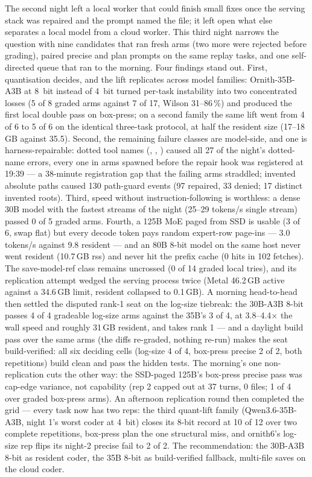\begin{center}
\begin{minipage}{0.86\textwidth}
The second night left a local worker that could finish small fixes once the serving stack was repaired and the
prompt named the file; it left open what else separates a local model from a cloud worker. This third night
narrows the question with nine candidates that ran fresh arms (two more were rejected before grading), paired
precise and plan prompts on the same replay tasks, and one self-directed queue that ran to the morning. Four
findings stand out. First, quantisation decides, and the lift replicates across model families: Ornith-35B-A3B at
8~bit instead of 4~bit turned per-task instability into two concentrated losses (5 of 8 graded arms against 7 of
17, Wilson 31--86\,\%) and produced the first local double pass on box-press; on a second family the same lift
went from 4 of 6 to 5 of 6 on the identical three-task protocol, at half the resident size (17--18\,GB against
35.5). Second, the remaining failure classes are model-side, and one is harness-repairable: dotted tool names
(, , ) caused all 27 of the night's dotted-name errors, every one in
arms spawned before the repair hook was registered at 19:39 --- a 38-minute registration gap that the failing
arms straddled; invented absolute paths caused 130 path-guard events (97 repaired, 33 denied; 17 distinct
invented roots). Third, speed without instruction-following is worthless: a dense 30B model with the fastest
streams of the night (25--29 tokens/s single stream) passed 0 of 5 graded arms. Fourth, a 125B MoE paged from
SSD is usable (3 of 6, swap flat) but every decode token pays random expert-row page-ins --- 3.0 tokens/s
against 9.8 resident --- and an 80B 8-bit model on the same host never went resident (10.7\,GB rss) and never hit
the prefix cache (0 hits in 102 fetches). The save-model-ref class remains uncrossed (0 of 14 graded local
tries), and its replication attempt wedged the serving process twice (Metal 46.2\,GB active against a 34.6\,GB
limit, resident collapsed to 0.1\,GB). A morning head-to-head then settled the disputed rank-1 seat on the
log-size tiebreak: the 30B-A3B 8-bit passes 4 of 4 gradeable log-size arms against the 35B's 3 of 4, at
3.8--4.4$\times$ the wall speed and roughly 31\,GB resident, and takes rank 1 --- and a daylight build pass over
the same arms (the diffs re-graded, nothing re-run) makes the seat build-verified: all six deciding cells
(log-size 4 of 4, box-press precise 2 of 2, both repetitions) build clean and pass the hidden tests. The
morning's one non-replication cuts the other way: the SSD-paged 125B's box-press precise pass was cap-edge
variance, not capability (rep 2 capped out at 37 turns, 0 files; 1 of 4 over graded box-press arms). An
afternoon replication round then completed the grid --- every task now has two reps: the third quant-lift
family (Qwen3.6-35B-A3B, night 1's worst coder at 4~bit) closes its 8-bit record at 10 of 12 over two complete
repetitions, box-press plan the one structural miss, and ornith6's log-size rep flips its night-2 precise fail
to 2 of 2. The
recommendation: the 30B-A3B 8-bit as resident coder, the 35B 8-bit as build-verified fallback, multi-file saves
on the cloud coder.


\end{minipage}
\end{center}
